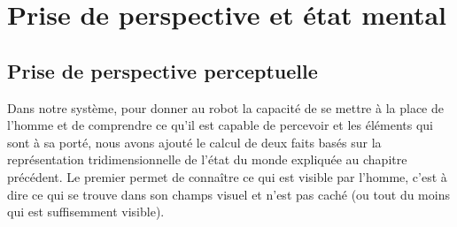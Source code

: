 \documentclass[a4paper,11pt,twoside]{StyleThese}
\begin{document}





\section{Prise de perspective et état mental}

\subsection{Prise de perspective perceptuelle}
\label{sec:perceptuelle}

Dans notre système, pour donner au robot la capacité de se mettre à la place de l'homme et de comprendre ce qu'il est capable de percevoir et les éléments qui sont à sa porté, nous avons ajouté le calcul de deux faits basés sur la représentation tridimensionnelle de l'état du monde expliquée au chapitre précédent. Le premier permet de connaître ce qui est visible par l'homme, c'est à dire ce qui se trouve dans son champs visuel et n'est pas caché (ou tout du moins qui est suffisemment visible).

\end{document}
